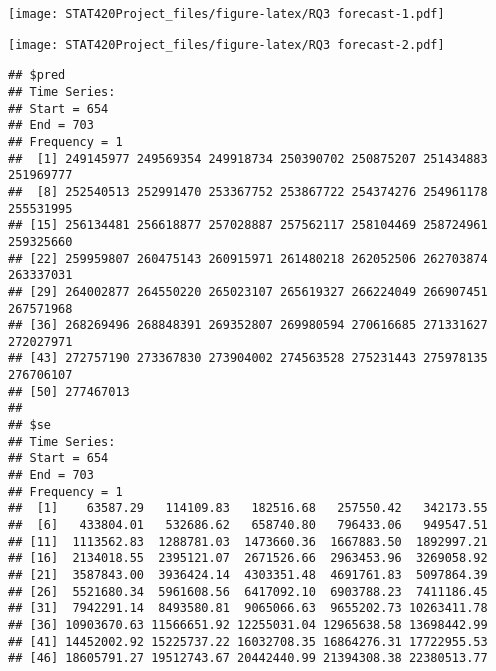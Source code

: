 \documentclass[]{article}
\newenvironment{Shaded}{\begin{snugshade}}{\end{snugshade}}
\newcommand{\CommentTok}[1]{\textcolor[rgb]{0.56,0.35,0.01}{\textit{#1}}}
\newcommand{\DecValTok}[1]{\textcolor[rgb]{0.00,0.00,0.81}{#1}}
\newcommand{\KeywordTok}[1]{\textcolor[rgb]{0.13,0.29,0.53}{\textbf{#1}}}
\newcommand{\NormalTok}[1]{#1}
\newcommand{\OperatorTok}[1]{\textcolor[rgb]{0.81,0.36,0.00}{\textbf{#1}}}
\begin{document}
\texttt{[image: STAT420Project\_files/figure-latex/RQ3 forecast-1.pdf]}

\begin{Shaded}
\end{Shaded}

\texttt{[image: STAT420Project\_files/figure-latex/RQ3 forecast-2.pdf]}

\begin{verbatim}
## $pred
## Time Series:
## Start = 654 
## End = 703 
## Frequency = 1 
##  [1] 249145977 249569354 249918734 250390702 250875207 251434883 251969777
##  [8] 252540513 252991470 253367752 253867722 254374276 254961178 255531995
## [15] 256134481 256618877 257028887 257562117 258104469 258724961 259325660
## [22] 259959807 260475143 260915971 261480218 262052506 262703874 263337031
## [29] 264002877 264550220 265023107 265619327 266224049 266907451 267571968
## [36] 268269496 268848391 269352807 269980594 270616685 271331627 272027971
## [43] 272757190 273367830 273904002 274563528 275231443 275978135 276706107
## [50] 277467013
## 
## $se
## Time Series:
## Start = 654 
## End = 703 
## Frequency = 1 
##  [1]    63587.29   114109.83   182516.68   257550.42   342173.55
##  [6]   433804.01   532686.62   658740.80   796433.06   949547.51
## [11]  1113562.83  1288781.03  1473660.36  1667883.50  1892997.21
## [16]  2134018.55  2395121.07  2671526.66  2963453.96  3269058.92
## [21]  3587843.00  3936424.14  4303351.48  4691761.83  5097864.39
## [26]  5521680.34  5961608.56  6417092.10  6903788.23  7411186.45
## [31]  7942291.14  8493580.81  9065066.63  9655202.73 10263411.78
## [36] 10903670.63 11566651.92 12255031.04 12965638.58 13698442.99
## [41] 14452002.92 15225737.22 16032708.35 16864276.31 17722955.53
## [46] 18605791.27 19512743.67 20442440.99 21394308.38 22380513.77
\end{verbatim}

\begin{Shaded}
\end{Shaded}
\end{document}
